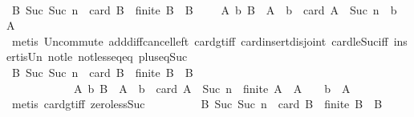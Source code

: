 \begin{isabellebody}
\ \ \ \ \ \ \isamarkupfalse%
\ {\isachardoublequoteopen}{\isasymforall}B{\isachardot}\ Suc\ {\isacharparenleft}Suc\ n{\isacharparenright}\ {\isacharequal}\ card\ B\ {\isasymlongrightarrow}\ finite\ B\ {\isasymlongrightarrow}\ B\ {\isasymnoteq}\ {\isasymemptyset}\ {\isasymlongrightarrow}\ {\isacharparenleft}{\isasymexists}\ A{\isacharprime}\ b{\isachardot}\ B\ {\isacharequal}\ A{\isacharprime}\ {\isasymunion}\ {\isacharbraceleft}b{\isacharbraceright}\ {\isasymand}\ card\ A{\isacharprime}\ {\isacharequal}\ Suc\ n\ {\isasymand}\ b\ {\isasymnotin}\ A{\isacharprime}{\isacharparenright}{\isachardoublequoteclose}\isanewline
\ \ \ \ \ \ \ \ \isamarkupfalse%
\ {\isacharparenleft}metis\ Un{\isacharunderscore}commute\ add{\isacharunderscore}diff{\isacharunderscore}cancel{\isacharunderscore}left{\isacharprime}\ card{\isacharunderscore}gt{\isacharunderscore}{}{\isacharunderscore}iff\ card{\isacharunderscore}insert{\isacharunderscore}disjoint\ card{\isacharunderscore}le{\isacharunderscore}Suc{\isacharunderscore}iff\ insert{\isacharunderscore}is{\isacharunderscore}Un\ not{\isacharunderscore}le\ not{\isacharunderscore}less{\isacharunderscore}eq{\isacharunderscore}eq\ plus{\isacharunderscore}{}{\isacharunderscore}eq{\isacharunderscore}Suc{\isacharparenright}\isanewline
\ \ \ \ \ \ \isamarkupfalse%
\ \isamarkupfalse%
\ {\isachardoublequoteopen}{\isasymforall}B{\isachardot}\ Suc\ {\isacharparenleft}Suc\ n{\isacharparenright}\ {\isacharequal}\ card\ B\ {\isasymlongrightarrow}\ finite\ B\ {\isasymlongrightarrow}\ B\ {\isasymnoteq}\ {\isasymemptyset}\ \isanewline
\ \ \ \ \ \ \ \ \ \ {\isasymlongrightarrow}\ {\isacharparenleft}{\isasymexists}\ A{\isacharprime}\ b{\isachardot}\ B\ {\isacharequal}\ A{\isacharprime}\ {\isasymunion}\ {\isacharbraceleft}b{\isacharbraceright}\ {\isasymand}\ card\ A{\isacharprime}\ {\isacharequal}\ Suc\ n\ {\isasymand}\ finite\ A{\isacharprime}\ {\isasymand}\ A{\isacharprime}\ {\isasymnoteq}\ {\isasymemptyset}\ {\isasymand}\ b\ {\isasymnotin}\ A{\isacharprime}{\isacharparenright}{\isachardoublequoteclose}\isanewline
\ \ \ \ \ \ \ \ \isamarkupfalse%
\ {\isacharparenleft}metis\ card{\isacharunderscore}gt{\isacharunderscore}{}{\isacharunderscore}iff\ zero{\isacharunderscore}less{\isacharunderscore}Suc{\isacharparenright}\isanewline
\ \ \ \ \ \ \isamarkupfalse%
\ \isamarkupfalse%
\ {\isachardoublequoteopen}{\isasymforall}B{\isachardot}\ Suc\ {\isacharparenleft}Suc\ n{\isacharparenright}\ {\isacharequal}\ card\ B\ {\isasymlongrightarrow}\ finite\ B\ {\isasymlongrightarrow}\ B\ {\isasymnoteq}\ {\isasymemptyset}\isanewline

\end{isabellebody}
